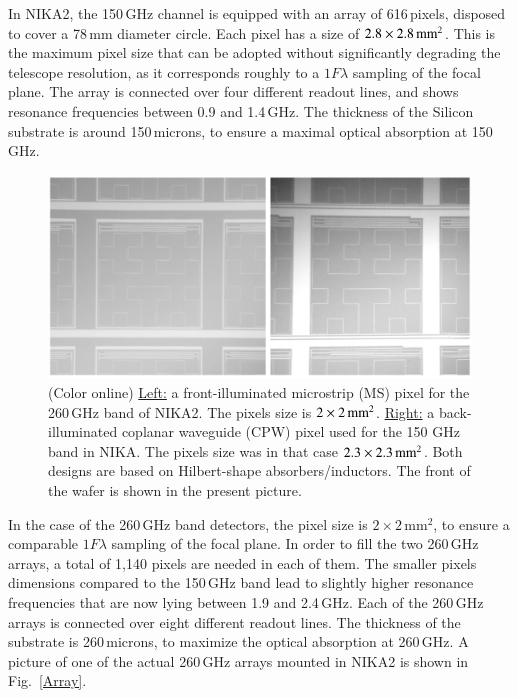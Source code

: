 \documentclass[]{aa} %
\begin{document}
In NIKA2, the 150\,GHz channel is equipped with an array of 616\,pixels, disposed to cover a 78\,mm diameter circle. Each pixel has a size of $2.8\times2.8\textrm{\,mm}^2$. This is the maximum pixel size that can be adopted without significantly degrading the telescope resolution, as it corresponds roughly to a $1 F \lambda$ sampling of the focal plane. The array is connected over four different readout lines, and shows resonance frequencies between 0.9 and 1.4\,GHz. The thickness of the Silicon substrate is around 150\,microns, to ensure a maximal optical absorption at 150\,GHz. 

\begin{figure}[h]
   \centering
  	\includegraphics[width=.95\linewidth]{fig3_AB.png}
     \caption{(Color online) \underline{Left:} a front-illuminated microstrip (MS) pixel for the 260\,GHz band of NIKA2. The pixels size is $2\times2\textrm{\,mm}^2$. \underline{Right:} a back-illuminated coplanar waveguide (CPW) pixel used for the 150 GHz band in NIKA. The pixels size was in that case $2.3\times2.3\textrm{\,mm}^2$. Both designs are based on Hilbert-shape absorbers/inductors. The front of the wafer is shown in the present picture.}
         \label{Pixels}
\end{figure}

In the case of the 260\,GHz band detectors, the pixel size is $2\times 2\mathrm{\,mm}^2$, to ensure a comparable $1 F \lambda$ sampling of the focal plane. In order to fill the two 260\,GHz arrays, a total of 1,140 pixels are needed in each of them. The smaller pixels dimensions compared to the 150\,GHz band lead to slightly higher resonance frequencies that are now lying between 1.9 and 2.4\,GHz. Each of the 260\,GHz arrays is connected over eight different readout lines. The thickness of the substrate is 260\,microns, to maximize the optical absorption at 260\,GHz. A picture of one of the actual 260\,GHz arrays mounted in NIKA2 is shown in Fig.~\ref{Array}.
\end{document}
